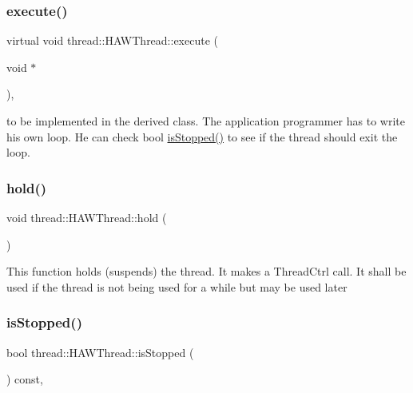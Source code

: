 \subsubsection{\texorpdfstring{execute()}{execute()}}
{\footnotesize\ttfamily virtual void thread\+::\+H\+A\+W\+Thread\+::execute (\begin{DoxyParamCaption}\item[{void $\ast$}]{ }\end{DoxyParamCaption})\hspace{0.3cm}{\ttfamily [protected]}, {}}

to be implemented in the derived class. The application programmer has to write his own loop. He can check bool \hyperlink{classthread_1_1_h_a_w_thread_acd3923a840cbe1fea040fc149c4ab749}{is\+Stopped()} to see if the thread should exit the loop. \hypertarget{classthread_1_1_h_a_w_thread_a18f2a0cc61833e98b18e56ea541fa38b}{}\label{classthread_1_1_h_a_w_thread_a18f2a0cc61833e98b18e56ea541fa38b} 
\subsubsection{\texorpdfstring{hold()}{hold()}}
{\footnotesize\ttfamily void thread\+::\+H\+A\+W\+Thread\+::hold (\begin{DoxyParamCaption}{ }\end{DoxyParamCaption})}

This function holds (suspends) the thread. It makes a Thread\+Ctrl call. It shall be used if the thread is not being used for a while but may be used later \hypertarget{classthread_1_1_h_a_w_thread_acd3923a840cbe1fea040fc149c4ab749}{}\label{classthread_1_1_h_a_w_thread_acd3923a840cbe1fea040fc149c4ab749} 
\subsubsection{\texorpdfstring{is\+Stopped()}{isStopped()}}
{\footnotesize\ttfamily bool thread\+::\+H\+A\+W\+Thread\+::is\+Stopped (\begin{DoxyParamCaption}{ }\end{DoxyParamCaption}) const\hspace{0.3cm}{\ttfamily [inline]}, {\ttfamily [protected]}}

